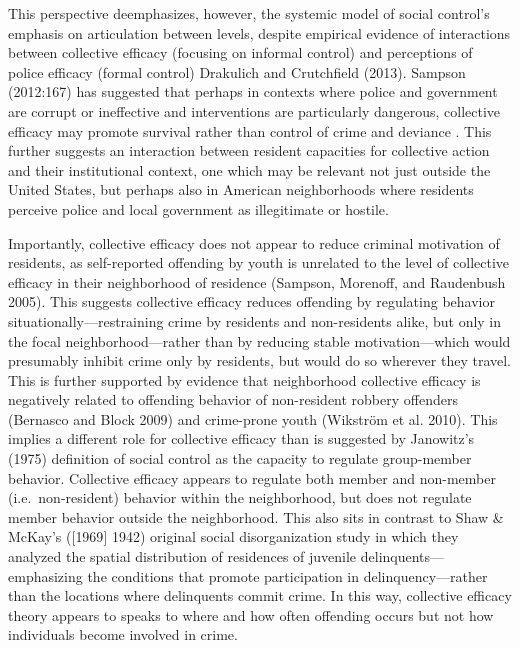 \documentclass [11pt, proquest] {uwthesis}[2015/03/03]
\begin{document}
This perspective deemphasizes, however, the systemic model of social control's emphasis on articulation between levels, despite empirical evidence of interactions between collective efficacy (focusing on informal control) and perceptions of police efficacy (formal control) Drakulich and Crutchfield (2013). Sampson (2012:167) has suggested that perhaps in contexts where police and government are corrupt or ineffective and interventions are particularly dangerous, collective efficacy may promote survival rather than control of crime and deviance . This further suggests an interaction between resident capacities for collective action and their institutional context, one which may be relevant not just outside the United States, but perhaps also in American neighborhoods where residents perceive police and local government as illegitimate or hostile.

Importantly, collective efficacy does not appear to reduce criminal motivation of residents, as self-reported offending by youth is unrelated to the level of collective efficacy in their neighborhood of residence (Sampson, Morenoff, and Raudenbush 2005). This suggests collective efficacy reduces offending by regulating behavior situationally---restraining crime by residents and non-residents alike, but only in the focal neighborhood---rather than by reducing stable motivation---which would presumably inhibit crime only by residents, but would do so wherever they travel. This is further supported by evidence that neighborhood collective efficacy is negatively related to offending behavior of non-resident robbery offenders (Bernasco and Block 2009) and crime-prone youth (Wikström et al. 2010). This implies a different role for collective efficacy than is suggested by Janowitz's (1975) definition of social control as the capacity to regulate group-member behavior. Collective efficacy appears to regulate both member and non-member (i.e.~non-resident) behavior within the neighborhood, but does not regulate member behavior outside the neighborhood. This also sits in contrast to Shaw \& McKay's ({[}1969{]} 1942) original social disorganization study in which they analyzed the spatial distribution of residences of juvenile delinquents---emphasizing the conditions that promote participation in delinquency---rather than the locations where delinquents commit crime. In this way, collective efficacy theory appears to speaks to where and how often offending occurs but not how individuals become involved in crime.
\end{document}
